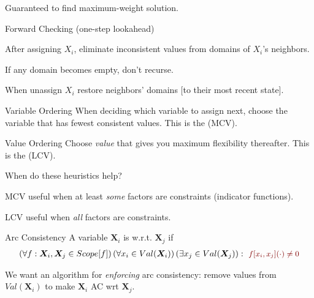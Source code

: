 \documentclass[11pt]{article}
\renewcommand\vec[2][]{\bm{#2}_{#1}}
\begin{document}
Guaranteed to find maximum-weight solution.

\begin{itemdefinition}{Forward Checking (one-step lookahead)}
	\item After assigning $X_i$, eliminate inconsistent values from domains of $X_i$'s neighbors.
	\item If any domain becomes empty, don't recurse.
	\item When unassign $X_i$ restore neighbors' domains [to their most recent state].
\end{itemdefinition}

\begin{definition}{Variable Ordering}
	When deciding which variable to assign next, choose the variable that has  fewest consistent values. This is the  (MCV).
\end{definition}

\begin{definition}{Value Ordering }
	Choose \textit{value} that gives you maximum flexibility thereafter. This is the  (LCV).
\end{definition}


When do these heuristics help?
\begin{compactitem}
	\item MCV useful when at least \textit{some} factors are constraints (indicator functions).
	
	\item LCV useful when \textit{all} factors are constraints. 
\end{compactitem}

\begin{definition}{Arc Consistency }
	A variable $\vec[i]{X}$ is  w.r.t. $\vec[j]{X}$ if 
	\begin{align}
	(\forall f: \vec[i]{X}, \vec[j]{X} \in Scope[f])
	\left(\forall x_i \in Val(\vec[i]{X}) \right)
	(\exists x_j \in Val(\vec[j]{X}))
	: ~ 
	\mred{f[x_i, x_j](\cdot) \ne 0}
	\end{align}
\end{definition}
We want an algorithm for \textit{enforcing} arc consistency: remove values from $Val(\vec[i]{X})$ to make $\vec[i]{X}$ AC wrt $\vec[j]{X}$. 
\end{document}
